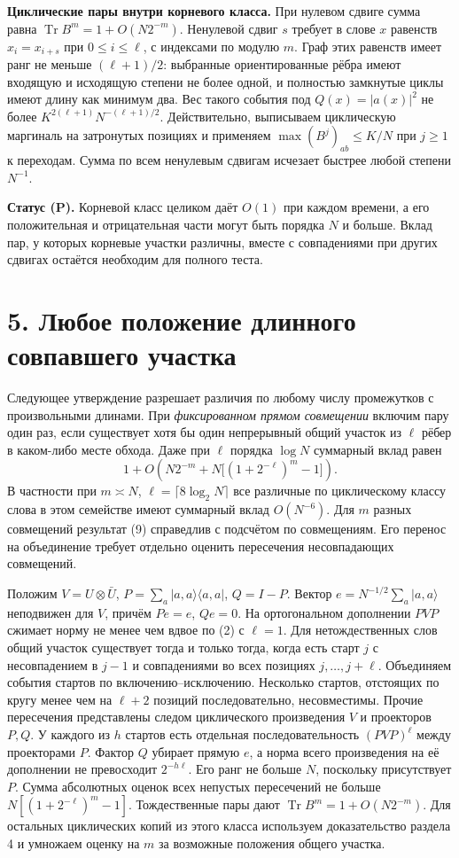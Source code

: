 \documentclass[11pt,a4paper]{article}
\newcommand{\Tr}{\operatorname{Tr}}
\newcommand{\sect}[1]{\section*{\sffamily\color{ink}#1}}
\newcommand{\subt}[1]{\par\medskip\noindent\textbf{#1.}\quad}
\begin{document}
\subt{Циклические пары внутри корневого класса}
При нулевом сдвиге сумма равна $\Tr B^m=1+O(N2^{-m})$. Ненулевой сдвиг $s$ требует в слове $x$ равенств $x_i=x_{i+s}$ при $0\le i\le\ell$, с индексами по модулю $m$. Граф этих равенств имеет ранг не меньше $(\ell+1)/2$: выбранные ориентированные рёбра имеют входящую и исходящую степени не более одной, и полностью замкнутые циклы имеют длину как минимум два. Вес такого события под $Q(x)=|a(x)|^2$ не более $K^{2(\ell+1)}N^{-(\ell+1)/2}$. Действительно, выписываем циклическую маргиналь на затронутых позициях и применяем $\max (B^j)_{ab}\le K/N$ при $j\ge1$ к переходам. Сумма по всем ненулевым сдвигам исчезает быстрее любой степени $N^{-1}$.

\textbf{Статус (P).} Корневой класс целиком даёт $O(1)$ при каждом времени, а его положительная и отрицательная части могут быть порядка $N$ и больше. Вклад пар, у которых корневые участки различны, вместе с совпадениями при других сдвигах остаётся необходим для полного теста.
\newpage
\sect{5. Любое положение длинного совпавшего участка}
Следующее утверждение разрешает различия по любому числу промежутков с произвольными длинами. При \emph{фиксированном прямом совмещении} включим пару один раз, если существует хотя бы один непрерывный общий участок из $\ell$ рёбер в каком-либо месте обхода. Даже при $\ell$ порядка $\log N$ суммарный вклад равен
\[
                 1+O\!\left(N2^{-m}
                        +N\big[(1+2^{-\ell})^m-1\big]\right).         \tag{9}
\]
В частности при $m\asymp N$, $\ell=\lceil8\log_2 N\rceil$ все различные по циклическому классу слова в этом семействе имеют суммарный вклад $O(N^{-6})$. Для $m$ разных совмещений результат (9) справедлив с подсчётом по совмещениям. Его перенос на объединение требует отдельно оценить пересечения несовпадающих совмещений.

Положим $V=U\otimes\bar U$, $P=\sum_a|a,a\rangle\langle a,a|$, $Q=I-P$. Вектор $e=N^{-1/2}\sum_a|a,a\rangle$ неподвижен для $V$, причём $Pe=e$, $Qe=0$. На ортогональном дополнении $PVP$ сжимает норму не менее чем вдвое по (2) с $\ell=1$. Для нетождественных слов общий участок существует тогда и только тогда, когда есть старт $j$ с несовпадением в $j-1$ и совпадениями во всех позициях $j,\ldots,j+\ell$. Объединяем события стартов по включению--исключению. Несколько стартов, отстоящих по кругу менее чем на $\ell+2$ позиций последовательно, несовместимы. Прочие пересечения представлены следом циклического произведения $V$ и проекторов $P,Q$. У каждого из $h$ стартов есть отдельная последовательность $(PVP)^\ell$ между проекторами $P$. Фактор $Q$ убирает прямую $e$, а норма всего произведения на её дополнении не превосходит $2^{-h\ell}$. Его ранг не больше $N$, поскольку присутствует $P$. Сумма абсолютных оценок всех непустых пересечений не больше $N[(1+2^{-\ell})^m-1]$. Тождественные пары дают $\Tr B^m=1+O(N2^{-m})$. Для остальных циклических копий из этого класса используем доказательство раздела 4 и умножаем оценку на $m$ за возможные положения общего участка.
\end{document}
